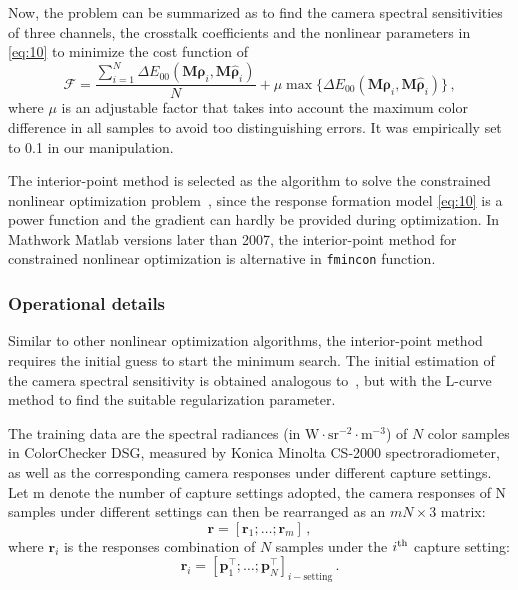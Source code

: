 \documentclass[9pt,twocolumn,twoside]{osajnl}
\begin{document}
Now, the problem can be summarized as to find the camera spectral sensitivities of three channels, the crosstalk coefficients and the nonlinear parameters in \eqref{eq:10} to minimize the cost function of
\begin{equation}
\mathcal{F} = \frac{\sum\limits_{i = 1}^N\Delta{}E_{00}\left(\mathbf{M}\boldsymbol{\rho}_i, \mathbf{M}\hat{\boldsymbol{\rho}}_i\right)}{N} + \mu\max\big\{\Delta{}E_{00}\left(\mathbf{M}\boldsymbol{\rho}_i, \mathbf{M}\hat{\boldsymbol{\rho}}_i\right)\big\}\,,
\label{eq:12}
\end{equation}
where $\mu$ is an adjustable factor that takes into account the maximum color difference in all samples to avoid too distinguishing errors. It was empirically set to 0.1 in our manipulation.

The interior-point method is selected as the algorithm to solve the constrained nonlinear optimization problem~\cite{Byrd:99,Forsgren:02}, since the response formation model \eqref{eq:10} is a power function and the gradient can hardly be provided during optimization. In Mathwork Matlab versions later than 2007, the interior-point method for constrained nonlinear optimization is alternative in \verb|fmincon| function.

\subsubsection{Operational details}\label{sec:operational details}

Similar to other nonlinear optimization algorithms, the interior-point method requires the initial guess to start the minimum search. The initial estimation of the camera spectral sensitivity is obtained analogous to~\cite{Barnard:02}, but with the L-curve method to find the suitable regularization parameter.

The training data are the spectral radiances (in $\text{W}\cdot\text{sr}^{-2}\cdot\text{m}^{-3}$) of $N$ color samples in ColorChecker DSG, measured by Konica Minolta CS-2000 spectroradiometer, as well as the corresponding camera responses under different capture settings. Let m denote the number of capture settings adopted, the camera responses of N samples under different settings can then be rearranged as an $mN\times3$ matrix:
\begin{equation}
\mathbf{r} = \left[\mathbf{r}_1;\ldots;\mathbf{r}_m\right]\,,
\label{eq:13}
\end{equation}
where $\mathbf{r}_i$ is the responses combination of $N$ samples under the $i\textsuperscript{th}$ capture setting:
\begin{equation}
\mathbf{r}_i = \left[\mathbf{p}_1^\intercal;\ldots;\mathbf{p}_N^\intercal\right]_{i-\text{setting}}\,.
\label{eq:14}
\end{equation}
\end{document}
